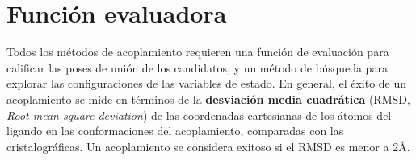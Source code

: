 \section{Función evaluadora}
Todos los métodos de acoplamiento requieren una función de evaluación
para calificar las poses de unión de los candidatos, y un método de
búsqueda para explorar las configuraciones de las variables de
estado. En general, el éxito de un acoplamiento se mide en términos de
la \textbf{desviación media cuadrática}
(RMSD, \textit{Root-mean-square deviation}) de las coordenadas
cartesianas de los átomos del ligando en las conformaciones del
acoplamiento, comparadas con las cristalográficas. Un acoplamiento se
considera exitoso si el RMSD es menor a 2\AA.\@
